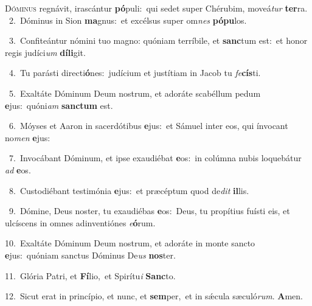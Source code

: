 \lettrine{\initial\textcolor{\initialcolor}{D}}{óminus} regnávit, irascántur \textbf{pó}\-puli:~\star qui sedet super Chérubim, moveá\textit{tur} \textbf{ter}\-ra.\\
{\numbfont\textcolor{\numbcolor}{~2.}}~Dóminus in Sion \textbf{ma}\-gnus:~\star et excélsus super om\textit{nes} \textbf{pó}\-\textbf{pu}los.\par
{\numbfont\textcolor{\numbcolor}{~3.}}~Confiteántur nómini tuo magno: quóniam terríbile, et \textbf{sanc}\-tum est:~\star et honor regis judíci\textit{um} \textbf{dí}\-\textbf{li}git.\par
{\numbfont\textcolor{\numbcolor}{~4.}}~Tu parásti directi\-\textbf{ó}\-nes:~\star judícium et justítiam in Jacob tu \textit{fe}\-\textbf{cís}ti.\par
{\numbfont\textcolor{\numbcolor}{~5.}}~Exaltáte Dóminum Deum nostrum, et adoráte scabéllum pedum \textbf{e}\-jus:~\star quóni\textit{am} \textbf{sanc}\-\textbf{tum} est.\par
{\numbfont\textcolor{\numbcolor}{~6.}}~Móyses et Aaron in sacerdótibus \textbf{e}\-jus:~\star et Sámuel inter eos, qui ínvocant no\textit{men} \textbf{e}\-jus:\par
{\numbfont\textcolor{\numbcolor}{~7.}}~Invocábant Dóminum, et ipse exaudiébat \textbf{e}\-os:~\star in colúmna nubis loquebátur \textit{ad} \textbf{e}\-os.\par
{\numbfont\textcolor{\numbcolor}{~8.}}~Custodiébant testimónia \textbf{e}\-jus:~\star et præcéptum quod de\textit{dit} \textbf{il}\-lis.\par
{\numbfont\textcolor{\numbcolor}{~9.}}~Dómine, Deus noster, tu exaudiébas \textbf{e}\-os:~\star Deus, tu propítius fuísti eis, et ulcíscens in omnes adinventiónes \textit{e}\-\textbf{ó}rum.\par
{\numbfont\textcolor{\numbcolor}{10.}}~Exaltáte Dóminum Deum nostrum, et adoráte in monte sancto \textbf{e}\-jus:~\star quóniam sanctus Dóminus De\textit{us} \textbf{nos}\-ter.\par
{\numbfont\textcolor{\numbcolor}{11.}}~Glória Patri, et \textbf{Fí}\-lio,~\star et Spirítu\textit{i} \textbf{Sanc}\-to.\par
{\numbfont\textcolor{\numbcolor}{12.}}~Sicut erat in princípio, et nunc, et \textbf{sem}\-per,~\star et in sǽcula sæculó\-\textit{rum}\-. \textbf{A}\-men.\par
